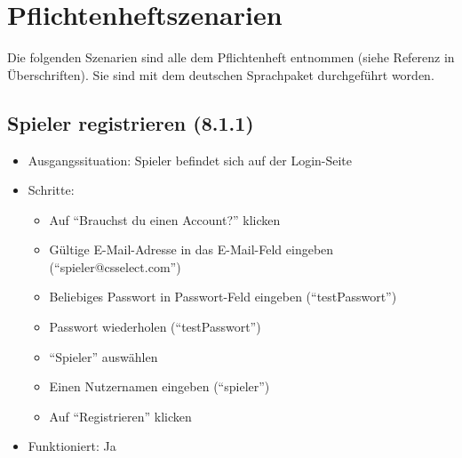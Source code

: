 \documentclass[a4paper]{scrreprt}
\begin{document}
        \section{Pflichtenheftszenarien}
        Die folgenden Szenarien sind alle dem Pflichtenheft entnommen (siehe Referenz in Überschriften). Sie sind mit dem deutschen Sprachpaket durchgeführt worden.

            \subsection{Spieler registrieren (8.1.1)}
            \begin{itemize}
                \item Ausgangssituation: Spieler befindet sich auf der Login-Seite
                \item Schritte:
                    \begin{itemize}
                        \item Auf \enquote{Brauchst du einen Account?} klicken
                        \item Gültige E-Mail-Adresse in das E-Mail-Feld eingeben (\enquote{spieler@csselect.com})
                        \item Beliebiges Passwort in Passwort-Feld eingeben (\enquote{testPasswort})
                        \item Passwort wiederholen (\enquote{testPasswort})
                        \item \enquote{Spieler} auswählen
                        \item Einen Nutzernamen eingeben (\enquote{spieler})
                        \item Auf \enquote{Registrieren} klicken
                    \end{itemize}
                \item Funktioniert: Ja
            \end{itemize}
\end{document}
